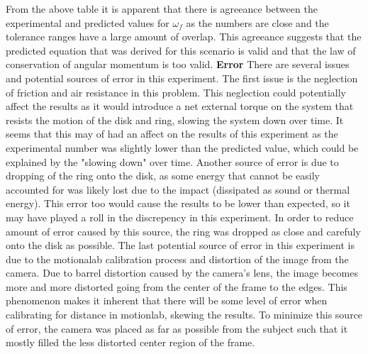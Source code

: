 \documentclass[12pt,letterpaper]{article}
\begin{document}
From the above table it is apparent that there is agreeance between the experimental and predicted values for \(\omega_f\) as the numbers are close and the tolerance ranges have a large amount of overlap. This agreeance suggests that the predicted equation that was derived for this scenario is valid and that the law of conservation of angular momentum is too valid. 
\newline\newline
\textbf{Error}
\newline
There are several issues and potential sources of error in this experiment. The first issue is the neglection of friction and air resistance in this problem. This neglection could potentially affect the results as it would introduce a net external torque on the system that resists the motion of the disk and ring, slowing the system down over time. It seems that this may of had an affect on the results of this experiment as the experimental number was slightly lower than the predicted value, which could be explained by the "slowing down" over time. Another source of error is due to dropping of the ring onto the disk, as some energy that cannot be easily accounted for was likely lost due to the impact (dissipated as sound or thermal energy). This error too would cause the results to be lower than expected, so it may have played a roll in the discrepency in this experiment. In order to reduce amount of error caused by this source, the ring was dropped as close and carefuly onto the disk as possible. The last potential source of error in this experiment is due to the motionalab calibration process and distortion of the image from the camera. Due to barrel distortion caused by the camera's lens, the image becomes more and more distorted going from the center of the frame to the edges. This phenomenon makes it inherent that there will be some level of error when calibrating for distance in motionlab, skewing the results. To minimize this source of error, the camera was placed as far as possible from the subject such that it mostly filled the less distorted center region of the frame.
\end{document}

